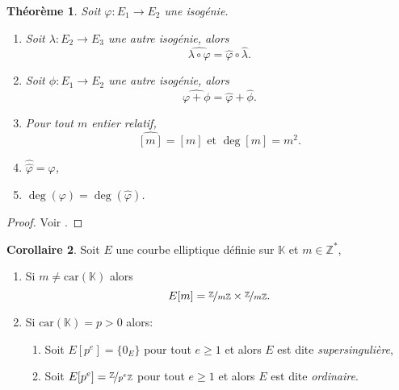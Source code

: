 \documentclass[10pt,a4paper]{book}
\theoremstyle{plain}
\newtheorem{thm}{Théorème}[chapter]
\theoremstyle{definition}
\theoremstyle{definition}
\theoremstyle{definition}
\newtheorem{cor}[thm]{Corollaire}
\theoremstyle{definition}
\theoremstyle{definition}
\theoremstyle{remark}
\theoremstyle{remark}
\theoremstyle{definition}
\begin{document}
\begin{thm}
Soit $\varphi:E_1 \rightarrow E_2$ une isogénie.
\begin{enumerate}
\item Soit $\lambda:E_2 \rightarrow E_3$ une autre isogénie, alors
\begin{equation*}
\widehat{\lambda \circ \varphi}= \widehat{\varphi} \circ \widehat{\lambda}.
\end{equation*} 
\item Soit $\phi:E_1 \rightarrow E_2$ une autre isogénie, alors
\begin{equation*}
\widehat{\varphi+\phi}=\widehat{\varphi}+\widehat{\phi}.
\end{equation*}
\item Pour tout $m$ entier relatif,
\begin{equation*}
\widehat{[m]}=[m] \text{ et } \deg[m]=m^2.
\end{equation*}
\item $\widehat{\widehat{\varphi}}=\varphi$,
\item $\deg(\varphi)=\deg(\widehat{\varphi})$.
\end{enumerate}
 
\end{thm}

\begin{proof}
Voir \cite[Theorem III.6.2]{Silv1}.
\end{proof}

\begin{cor}
Soit $E$ une courbe elliptique définie sur $\mathbb{K}$ et $m \in \mathbb{Z}^*$,
\begin{enumerate}
\item Si $m \neq \mathrm{car}(\mathbb{K})$ alors
\begin{equation*}
E[m]=\nicefrac{\mathbb{Z}}{m\mathbb{Z}} \times \nicefrac{\mathbb{Z}}{m\mathbb{Z}}. 
\end{equation*}
\item Si $\mathrm{car}(\mathbb{K})=p>0$ alors:
\begin{enumerate}
\item Soit $E[p^e]=\{0_E\}$ pour tout $e \geqslant 1$ et alors $E$ est dite \emph{supersingulière},
\item Soit $E[p^e]=\nicefrac{\mathbb{Z}}{p^e\mathbb{Z}}$ pour tout $e \geqslant 1$
et alors $E$ est dite \emph{ordinaire}.
\end{enumerate}
\end{enumerate}
\end{cor}
\end{document}
